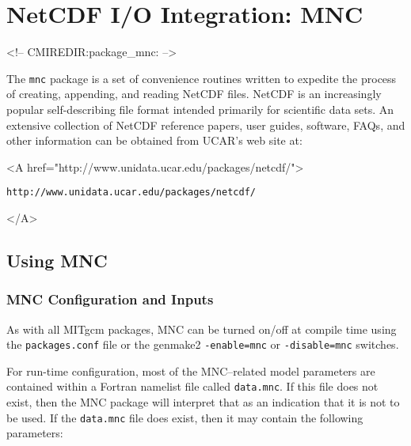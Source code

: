 
\section{NetCDF I/O Integration: MNC}
\label{sec:pkg:mnc}
\begin{rawhtml}
<!-- CMIREDIR:package_mnc: -->
\end{rawhtml}

The \texttt{mnc} package is a set of convenience routines written to
expedite the process of creating, appending, and reading NetCDF files.
NetCDF is an increasingly popular self-describing file format
\cite{rew:97} intended primarily for scientific data sets.  An
extensive collection of NetCDF reference papers, user guides,
software, FAQs, and other information can be obtained from UCAR's web
site at:
\begin{rawhtml} <A href="http://www.unidata.ucar.edu/packages/netcdf/"> \end{rawhtml}
\begin{verbatim}
http://www.unidata.ucar.edu/packages/netcdf/
\end{verbatim}
\begin{rawhtml} </A> \end{rawhtml}


\subsection{Using MNC}

\subsubsection{MNC Configuration and Inputs}

As with all MITgcm packages, MNC can be turned on/off at compile time
using the \texttt{packages.conf} file or the genmake2
\texttt{-enable=mnc} or \texttt{-disable=mnc} switches.

For run-time configuration, most of the MNC--related model parameters
are contained within a Fortran namelist file called \texttt{data.mnc}.
If this file does not exist, then the MNC package will interpret that
as an indication that it is not to be used.  If the \texttt{data.mnc}
file does exist, then it may contain the following parameters:

